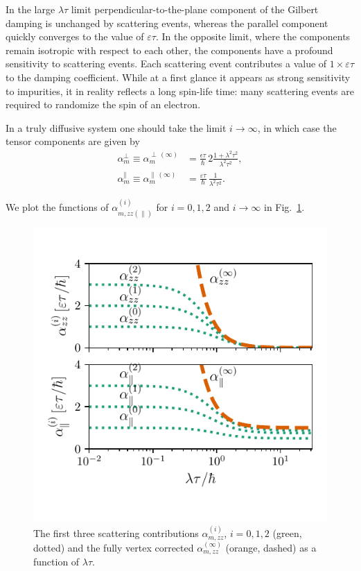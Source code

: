 In the large $\lambda\tau$ limit perpendicular-to-the-plane component of the Gilbert damping is unchanged by scattering events, whereas the parallel component quickly converges to the value of $\varepsilon\tau$. In the opposite limit, where the components remain isotropic with respect to each other, the components have a profound sensitivity to scattering events. Each scattering event contributes a value of $1\times\varepsilon\tau$ to the damping coefficient. While at a first glance it appears as strong sensitivity to impurities, it in reality reflects a long spin-life time: many scattering events are required to randomize the spin of an electron. 

In a truly diffusive system one should take the limit $i\rightarrow\infty$, in which case the tensor components are given by
\begin{align}
\label{eq:alphaperpzerodelta}
    \alpha_{m}^{\perp}\equiv\alpha_{m}^{\perp\,(\infty)}  & = \frac{\epsilon \tau}{\hbar}\, 2\frac{1+\lambda^2\tau^2}{\lambda^2\tau^2},\\
  \label{eq:alphaparallelzerodelta}  \alpha_{m}^{\parallel}\equiv\alpha_{m}^{\parallel\,(\infty)}  & = \frac{\varepsilon\tau}{\hbar}\,\frac{1}{\lambda^2\tau^2}.
\end{align}

We plot the functions of $\alpha_{m,zz(\parallel)}^{(i)}$ for $i=0,1,2$ and $i\rightarrow\infty$ in Fig.~\ref{fig:alpha_plot}. 
\begin{figure}
    \centering
    \includegraphics[width=\linewidth]{gfx/Chapter04/alpha_plot2}
    \caption{The first three scattering contributions $\alpha_{m,zz}^{(i)}$, $i=0,1,2$ (green, dotted) and the fully vertex corrected $\alpha_{m,zz}^{(\infty)}$ (orange, dashed) as a function of $\lambda \tau$. }
    \label{fig:alpha_plot}
\end{figure}

